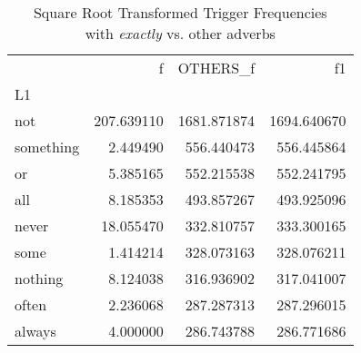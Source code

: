 
\begin{table}[ht]
\caption{Square Root Transformed Trigger Frequencies\\with \textit{exactly} vs. other adverbs}
\label{trig-exactly-others}
\begin{tabular}{lrrr}
\toprule
 & f & OTHERS\_f & f1 \\
L1 &  &  &  \\
\midrule
not & {\cellcolor[HTML]{081D58}} \color[HTML]{F1F1F1} 207.639110 & {\cellcolor[HTML]{081D58}} \color[HTML]{F1F1F1} 1681.871874 & {\cellcolor[HTML]{081D58}} \color[HTML]{F1F1F1} 1694.640670 \\
something & {\cellcolor[HTML]{FEFFD8}} \color[HTML]{000000} 2.449490 & {\cellcolor[HTML]{A0DAB8}} \color[HTML]{000000} 556.440473 & {\cellcolor[HTML]{A2DBB8}} \color[HTML]{000000} 556.445864 \\
or & {\cellcolor[HTML]{FCFED3}} \color[HTML]{000000} 5.385165 & {\cellcolor[HTML]{A2DBB8}} \color[HTML]{000000} 552.215538 & {\cellcolor[HTML]{A2DBB8}} \color[HTML]{000000} 552.241795 \\
all & {\cellcolor[HTML]{FAFDCF}} \color[HTML]{000000} 8.185353 & {\cellcolor[HTML]{B7E3B6}} \color[HTML]{000000} 493.857267 & {\cellcolor[HTML]{B7E3B6}} \color[HTML]{000000} 493.925096 \\
never & {\cellcolor[HTML]{F3FABF}} \color[HTML]{000000} 18.055470 & {\cellcolor[HTML]{DCF1B2}} \color[HTML]{000000} 332.810757 & {\cellcolor[HTML]{DCF1B2}} \color[HTML]{000000} 333.300165 \\
some & {\cellcolor[HTML]{FFFFD9}} \color[HTML]{000000} 1.414214 & {\cellcolor[HTML]{DDF2B2}} \color[HTML]{000000} 328.073163 & {\cellcolor[HTML]{DDF2B2}} \color[HTML]{000000} 328.076211 \\
nothing & {\cellcolor[HTML]{FAFDCF}} \color[HTML]{000000} 8.124038 & {\cellcolor[HTML]{DFF2B2}} \color[HTML]{000000} 316.936902 & {\cellcolor[HTML]{E0F3B2}} \color[HTML]{000000} 317.041007 \\
often & {\cellcolor[HTML]{FEFFD8}} \color[HTML]{000000} 2.236068 & {\cellcolor[HTML]{E5F5B2}} \color[HTML]{000000} 287.287313 & {\cellcolor[HTML]{E5F5B2}} \color[HTML]{000000} 287.296015 \\
always & {\cellcolor[HTML]{FDFED5}} \color[HTML]{000000} 4.000000 & {\cellcolor[HTML]{E5F5B2}} \color[HTML]{000000} 286.743788 & {\cellcolor[HTML]{E5F5B2}} \color[HTML]{000000} 286.771686 \\

\end{tabular}
\end{table}
